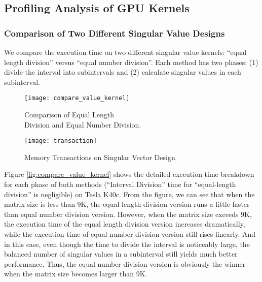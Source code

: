 \vspace{-0.1in}
\subsection{Profiling Analysis of GPU Kernels}

\subsubsection{Comparison of Two Different Singular Value Designs}
We compare the execution time on two different singular value kernels:
``equal length division'' versus ``equal number division''. Each
method has two phases: (1) divide the interval into subintervals and
(2) calculate singular values in each subinterval.
\begin{figure}[hbpt]
\vspace{-0.3in}
\begin{minipage}[t]{0.5\linewidth}
\centering
\texttt{[image: compare\_value\_kernel]}
\vspace{-0.1in}
\caption{Comparison of Equal Length \protect\\ Division and Equal Number Division.}
\label{fig:compare_value_kernel}
\end{minipage}%
\begin{minipage}[t]{0.5\linewidth}
\centering
\texttt{[image: transaction]}
\vspace{-0.1in}
\caption{Memory Transactions on Singular Vector Design}
\label{fig:transaction}
\end{minipage}
\vspace{-0.2in}
\end{figure}
Figure \ref{fig:compare_value_kernel} shows the detailed execution time breakdown for each phase of both methods (``Interval Division'' time for ``equal-length division'' is negligible) on Tesla K40c.
From the figure, we can see that when the matrix size is less than 9K, the equal length division version runs a little faster than equal number division version.
However, when the matrix size exceeds 9K, the execution time of the equal length division version increases dramatically, while the execution time of equal number division version still rises linearly.
And in this case, 
even though the time to divide the interval is noticeably
large, the balanced number of singular values in a subinterval
still yields much better performance.
Thus, the equal number division version is obviously the winner when the matrix size becomes larger than 9K.

